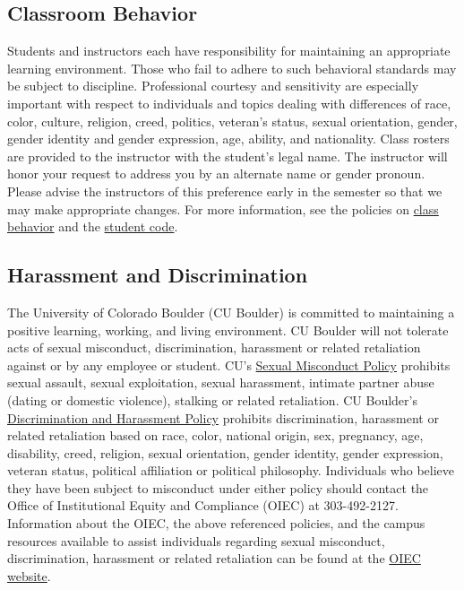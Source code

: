 \documentclass[10pt]{memoir}
\begin{document}
\subsection{Classroom Behavior}
Students and instructors each have responsibility for maintaining an appropriate learning environment. Those who fail to adhere to such behavioral standards may be subject to discipline. Professional courtesy and sensitivity are especially important with respect to individuals and topics dealing with differences of race, color, culture, religion, creed, politics, veteran’s status, sexual orientation, gender, gender identity and gender expression, age, ability, and nationality. Class rosters are provided to the instructor with the student's legal name. The instructor will honor your request to address you by an alternate name or gender pronoun. Please advise the instructors of this preference early in the semester so that we may make appropriate changes. For more information, see the policies on \href{http://www.colorado.edu/policies/student-classroom-and-course-related-behavior}{class behavior} and the \href{http://www.colorado.edu/osc/#student_code}{student code}.

\subsection{Harassment and Discrimination}
The University of Colorado Boulder (CU Boulder) is committed to maintaining a positive learning, working, and living environment. CU Boulder will not tolerate acts of sexual misconduct, discrimination, harassment or related retaliation against or by any employee or student. CU's \href{http://www.colorado.edu/policies/discrimination-and-harassment-policy-and-procedures}{Sexual Misconduct Policy} prohibits sexual assault, sexual exploitation, sexual harassment, intimate partner abuse (dating or domestic violence), stalking or related retaliation. CU Boulder's \href{http://www.colorado.edu/policies/discrimination-and-harassment-policy-and-procedures}{Discrimination and Harassment Policy} prohibits discrimination, harassment or related retaliation based on race, color, national origin, sex, pregnancy, age, disability, creed, religion, sexual orientation, gender identity, gender expression, veteran status, political affiliation or political philosophy. Individuals who believe they have been subject to misconduct under either policy should contact the Office of Institutional Equity and Compliance (OIEC) at 303-492-2127. Information about the OIEC, the above referenced policies, and the campus resources available to assist individuals regarding sexual misconduct, discrimination, harassment or related retaliation can be found at the \href{http://www.colorado.edu/institutionalequity/}{OIEC website}.
\end{document}
